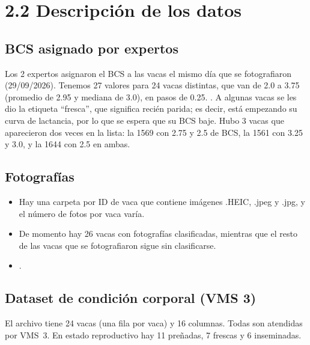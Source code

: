 \documentclass[11pt,letterpaper,DIV=12]{scrartcl}
\begin{document}
\section{2.2 Descripción de los datos}

\subsection{BCS asignado por expertos}

Los 2 expertos asignaron el BCS a las vacas el mismo día que se fotografiaron (29/09/2026). Tenemos 27 valores para 24 vacas distintas, que van de 2.0 a 3.75 (promedio de 2.95 y mediana de 3.0), en pasos de 0.25. . A algunas vacas se les dio la etiqueta ``fresca'', que significa recién parida; es decir, está empezando su curva de lactancia, por lo que se espera que su BCS baje. Hubo 3 vacas que aparecieron dos veces en la lista: la 1569 con 2.75 y 2.5 de BCS, la 1561 con 3.25 y 3.0, y la 1644 con 2.5 en ambas.

\subsection{Fotografías}

\begin{itemize}
  \item Hay una carpeta por ID de vaca que contiene imágenes .HEIC, .jpeg y .jpg, y el número de fotos por vaca varía.
  \item De momento hay 26 vacas con fotografías clasificadas, mientras que el resto de las vacas que se fotografiaron sigue sin clasificarse.
  \item {}.
\end{itemize}

\subsection{Dataset de condición corporal (VMS 3)}

El archivo tiene 24 vacas (una fila por vaca) y 16 columnas. Todas son atendidas por VMS~3. En estado reproductivo hay 11 preñadas, 7 frescas y 6 inseminadas.
\end{document}
